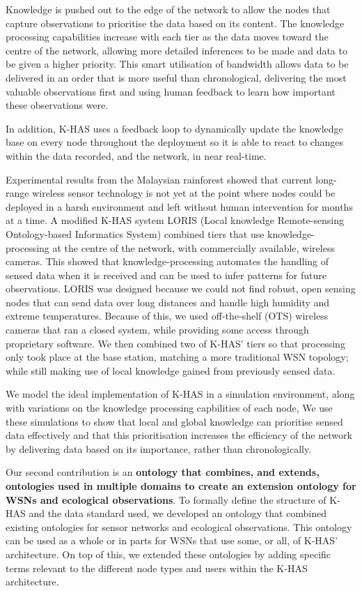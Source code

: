 Knowledge is pushed out to the edge of the network to allow the nodes that capture observations to prioritise the data based on its content. The knowledge processing capabilities increase with each tier as the data moves toward the centre of the network, allowing more detailed inferences to be made and data to be given a higher priority. This smart utilisation of bandwidth allows data to be delivered in an order that is more useful than chronological, delivering the most valuable observations first and using human feedback to learn how important these observations were. 

In addition, K-HAS uses a feedback loop to dynamically update the knowledge base on every node throughout the deployment so it is able to react to changes within the data recorded, and the network, in near real-time.

Experimental results from the Malaysian rainforest showed that current long-range wireless sensor technology is not yet at the point where nodes could be deployed in a harsh environment and left without human intervention for months at a time. A modified K-HAS system LORIS (Local knowledge Remote-sensing Ontology-based Informatics System) combined tiers that use knowledge-processing at the centre of the network, with commercially available, wireless cameras. This showed that knowledge-processing automates the handling of sensed data when it is received and can be used to infer patterns for future observations. LORIS was designed because we could not find robust, open sensing nodes that can send data over long distances and handle high humidity and extreme temperatures. Because of this, we used off-the-shelf (OTS) wireless cameras that ran a closed system, while providing some access through proprietary software. We then combined two of K-HAS' tiers so that processing only took place at the base station, matching a more traditional WSN topology; while still making use of local knowledge gained from previously sensed data.

We model the ideal implementation of K-HAS in a simulation environment, along with variations on the knowledge processing capbilities of each node, We use these simulations to show that local and global knowledge can prioritise sensed data effectively and that this prioritisation increases the efficiency of the network by delivering data based on its importance, rather than chronologically.

Our second contribution is an \textbf{ontology that combines, and extends, ontologies used in multiple domains to create an extension ontology for WSNs and ecological observations}. To formally define the structure of K-HAS and the data standard used, we developed an ontology that combined existing ontologies for sensor networks and ecological observations. This ontology can be used as a whole or in parts for WSNs that use some, or all, of K-HAS' architecture. On top of this, we extended these ontologies by adding specific terms relevant to the different node types and users within the K-HAS architecture.


